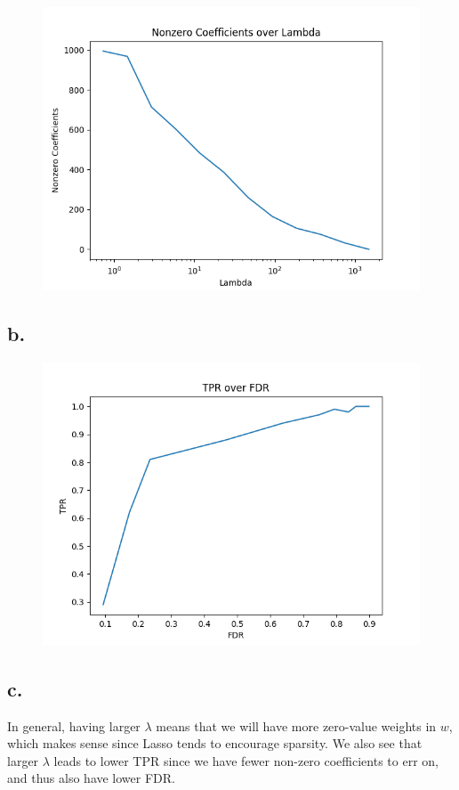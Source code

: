 \documentclass{article}
\newcommand{\1}{\mathbf{1}}
\begin{document}
{\begin{figure}[h]
  \centering
  \includegraphics[width=160mm]{../hw2-code/results/a4_a.png}
\end{figure}

\newpage

\subsection*{b.}

\begin{figure}[h]
  \centering
  \includegraphics[width=160mm]{../hw2-code/results/a4_b.png}
\end{figure}

\subsection*{c.}

In general, having larger $\lambda$ means that we will have more zero-value weights in $w$, which makes sense since Lasso tends to encourage sparsity. We also see that larger $\lambda$ leads to lower TPR since we have fewer non-zero coefficients to err on, and thus also have lower FDR.

\newpage

}
\end{document}
